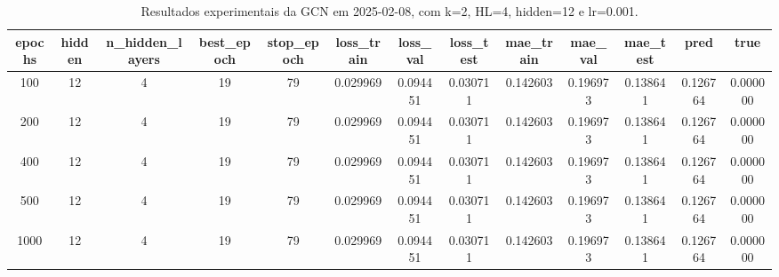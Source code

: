 \begin{table}[h]
\centering
\caption{Resultados experimentais da GCN em 2025-02-08, com k=2, HL=4, hidden=12 e lr=0.001.}
\label{tab:gcn_results_k2_hl4_h12_d20250208}
\begin{tabular}{ccccccccccccc}
\toprule
epochs & hidden & n\_hidden\_layers & best\_epoch & stop\_epoch & loss\_train & loss\_val & loss\_test & mae\_train & mae\_val & mae\_test & pred & true \\
\midrule
100 & 12 & 4 & 19 & 79 & 0.029969 & 0.094451 & 0.030711 & 0.142603 & 0.196973 & 0.138641 & 0.126764 & 0.000000 \\
200 & 12 & 4 & 19 & 79 & 0.029969 & 0.094451 & 0.030711 & 0.142603 & 0.196973 & 0.138641 & 0.126764 & 0.000000 \\
400 & 12 & 4 & 19 & 79 & 0.029969 & 0.094451 & 0.030711 & 0.142603 & 0.196973 & 0.138641 & 0.126764 & 0.000000 \\
500 & 12 & 4 & 19 & 79 & 0.029969 & 0.094451 & 0.030711 & 0.142603 & 0.196973 & 0.138641 & 0.126764 & 0.000000 \\
1000 & 12 & 4 & 19 & 79 & 0.029969 & 0.094451 & 0.030711 & 0.142603 & 0.196973 & 0.138641 & 0.126764 & 0.000000 \\
\bottomrule
\end{tabular}
\end{table}
